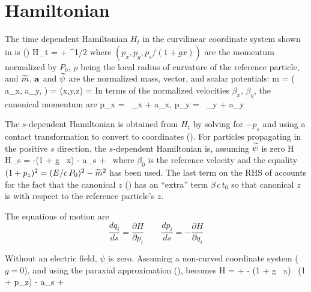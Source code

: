 \section{Hamiltonian}
\label{s:mag.hamiltonian}
The time dependent Hamiltonian $H_t$ in the curvilinear coordinate system shown
in  is (\cite{b:ruth})
\Begineq
  H_t = \wt\psi + ^{1/2}
\Endeq
where $(p_x, p_y, p_s/(1+gx))$ are the momentum normalized by $P_0$,
$\rho$ being the local radius of curvature of the reference particle,
and $\widetilde m$, ${\bf a}$ and $\widetilde\psi$ are the normalized mass, vector, and scalar
potentials:
\Begineq
  \wt m =  \qquad
  \left( a_x, a_y,  \right) =  \qquad 
  \wt\psi(x,y,z) = 
  \label{mmccp}
\Endeq
In terms of the normalized velocities $\beta_x$, $\beta_y$, the canonical momentum are
\Begineq
  p_x =  \, \beta_x + a_x, \qquad 
  p_y =  \, \beta_y + a_y
  \label{pmc2pc}
\Endeq

The $s$-dependent Hamiltonian is obtained from $H_t$ by solving for
$-p_s$ and using a contact transformation to convert to \bmad
coordinates (). For particles propagating in the
positive $s$ direction, the $s$-dependent Hamiltonian is, assuming
$\widetilde\psi$ is zero
\Begineq
  H \equiv H_s = -(1 + g \, x)  - 
  a_s +  \, 
  \label{h1gx1}
\Endeq
where $\beta_0$ is the reference velocity and the equality $(1 +
p_z)^2 = (E/c\, P_0)^2 - \widetilde m^2$ has been used. The last term on the
RHS of  accounts for the fact that the \bmad canonical $z$
() has an ``extra'' term $\beta \, c \, t_0$ so that \bmad
canonical $z$ is with respect to the reference particle's $z$.

The equations of motion are
\begin{equation}
  \frac{dq_i}{ds} = \frac{\partial H}{\partial p_i} \qquad
  \frac{dp_i}{ds} = -\frac{\partial H}{\partial q_i}
  \label{rshp}
\end{equation}

\label{paraxial approximation} 
Without an electric field, $\psi$ is zero. Assuming a non-curved
coordinate system ($g = 0$), and using the paraxial approximation
(),  becomes
\Begineq
  H =  +  - 
  (1 + g \, x) \, (1 + p_z) - a_s +    \, 
  \label{hpapa}
\Endeq

